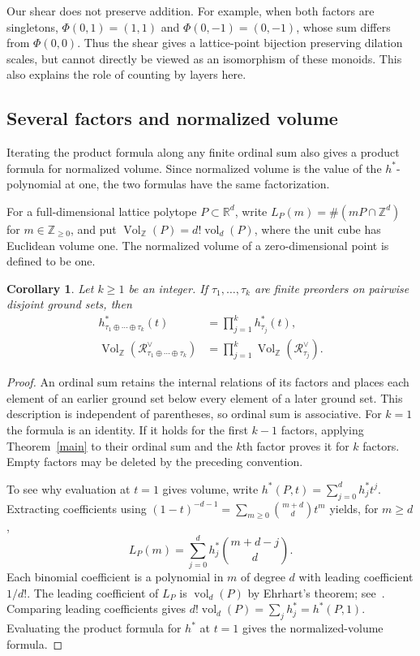 \documentclass[11pt,reqno]{amsart}
\numberwithin{equation}{section}
\newtheorem{corollary}[theorem]{Corollary}
\theoremstyle{definition}
\theoremstyle{remark}
\theoremstyle{definition}
\newcommand{\Rpoly}[1]{\mathcal R_{#1}^{\vee}}
\DeclareMathOperator{\Vol}{Vol}
\begin{document}
Our shear does not preserve addition. For example, when both factors are singletons, $\Phi(0,1)=(1,1)$ and $\Phi(0,-1)=(0,-1)$, whose sum differs from $\Phi(0,0)$. Thus the shear gives a lattice-point bijection preserving dilation scales, but cannot directly be viewed as an isomorphism of these monoids. This also explains the role of counting by layers here.

\subsection{Several factors and normalized volume}\label{sec:consequences}
Iterating the product formula along any finite ordinal sum also gives a product formula for normalized volume. Since normalized volume is the value of the $h^*$-polynomial at one, the two formulas have the same factorization.

For a full-dimensional lattice polytope $P\subset\mathbb R^d$, write $L_P(m)=\#(mP\cap\mathbb Z^d)$ for $m\in\mathbb Z_{\ge0}$, and put
$\Vol_{\mathbb Z}(P)=d!\operatorname{vol}_d(P)$, where the unit cube has Euclidean volume one. The normalized volume of a zero-dimensional point is defined to be one.

\begin{corollary}\label{multiple}
Let $k\ge1$ be an integer. If $\tau_1,\ldots,\tau_k$ are finite preorders on pairwise disjoint ground sets, then
\begin{align*}
 h_{\tau_1\oplus\cdots\oplus\tau_k}^*(t)
   &=\prod_{j=1}^k h_{\tau_j}^*(t),\\
 \Vol_{\mathbb Z}(\Rpoly{\tau_1\oplus\cdots\oplus\tau_k})
   &=\prod_{j=1}^k\Vol_{\mathbb Z}(\Rpoly{\tau_j}).
\end{align*}
\end{corollary}
\begin{proof}
An ordinal sum retains the internal relations of its factors and places each element of an earlier ground set below every element of a later ground set. This description is independent of parentheses, so ordinal sum is associative. For $k=1$ the formula is an identity. If it holds for the first $k-1$ factors, applying Theorem~\ref{main} to their ordinal sum and the $k$th factor proves it for $k$ factors. Empty factors may be deleted by the preceding convention.

To see why evaluation at $t=1$ gives volume, write $h^*(P,t)=\sum_{j=0}^d h_j^*t^j$. Extracting coefficients using
$(1-t)^{-d-1}=\sum_{m\ge0}\binom{m+d}{d}t^m$
yields, for $m\ge d$,
\[
L_P(m)=\sum_{j=0}^d h_j^*\binom{m+d-j}{d}.
\]
Each binomial coefficient is a polynomial in $m$ of degree $d$ with leading coefficient $1/d!$. The leading coefficient of $L_P$ is $\operatorname{vol}_d(P)$ by Ehrhart's theorem; see~\cite[Section~3.6]{BR}. Comparing leading coefficients gives
$d!\operatorname{vol}_d(P)=\sum_j h_j^*=h^*(P,1)$.
Evaluating the product formula for $h^*$ at $t=1$ gives the normalized-volume formula.
\end{proof}
\end{document}
